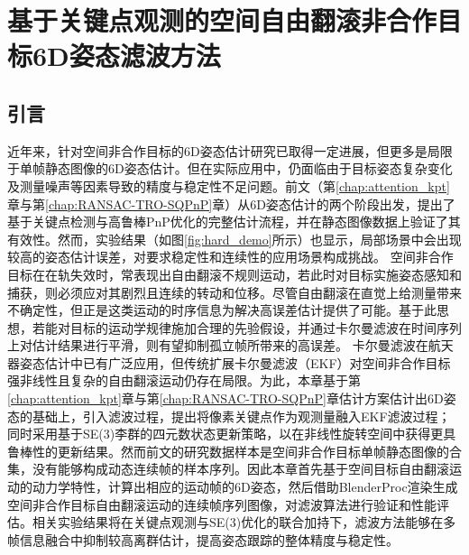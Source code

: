 \chapter{基于关键点观测的空间自由翻滚非合作目标6D姿态滤波方法}
\label{chap:SpaceFreeMotionEKF}
\section{引言}
近年来，针对空间非合作目标的6D姿态估计研究已取得一定进展，但更多是局限于单帧静态图像的6D姿态估计。但在实际应用中，仍面临由于目标姿态复杂变化及测量噪声等因素导致的精度与稳定性不足问题。前文（第\ref{chap:attention_kpt}章与第\ref{chap:RANSAC-TRO-SQPnP}章）从6D姿态估计的两个阶段出发，提出了基于关键点检测与高鲁棒PnP优化的完整估计流程，并在静态图像数据上验证了其有效性。然而，实验结果（如图\ref{fig:hard_demo}所示）也显示，局部场景中会出现较高的姿态估计误差，对要求稳定性和连续性的应用场景构成挑战。
空间非合作目标在在轨失效时，常表现出自由翻滚不规则运动，若此时对目标实施姿态感知和捕获，则必须应对其剧烈且连续的转动和位移。尽管自由翻滚在直觉上给测量带来不确定性，但正是这类运动的时序信息为解决高误差估计提供了可能。基于此思想，若能对目标的运动学规律施加合理的先验假设，并通过卡尔曼滤波在时间序列上对估计结果进行平滑，则有望抑制孤立帧所带来的高误差。
卡尔曼滤波在航天器姿态估计中已有广泛应用，但传统扩展卡尔曼滤波（EKF）对空间非合作目标强非线性且复杂的自由翻滚运动仍存在局限。为此，本章基于第\ref{chap:attention_kpt}章与第\ref{chap:RANSAC-TRO-SQPnP}章估计方案估计出6D姿态的基础上，引入滤波过程，提出将像素关键点作为观测量融入EKF滤波过程；同时采用基于SE(3)李群的四元数状态更新策略，以在非线性旋转空间中获得更具鲁棒性的更新结果。然而前文的研究数据样本是空间非合作目标单帧静态图像的合集，没有能够构成动态连续帧的样本序列。因此本章首先基于空间目标自由翻滚运动的动力学特性，计算出相应的运动帧的6D姿态，然后借助BlenderProc渲染生成空间非合作目标自由翻滚运动的连续帧序列图像，对滤波算法进行验证和性能评估。相关实验结果将在关键点观测与SE(3)优化的联合加持下，滤波方法能够在多帧信息融合中抑制较高离群估计，提高姿态跟踪的整体精度与稳定性。
